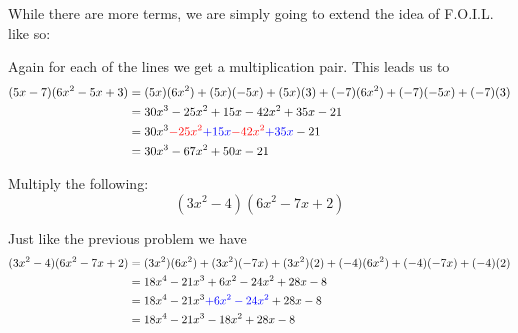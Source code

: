 \begin{solution}[2in]
While there are more terms, we are simply going to extend the idea of F.O.I.L. like so:
\begin{center}
\end{center}
Again for each of the lines we get a multiplication pair. This leads us to
\begin{align*}
(5x-7)(6x^2-5x+3)&=(5x)(6x^2)+(5x)(-5x)+(5x)(3)+(-7)(6x^2)+(-7)(-5x)+(-7)(3)\\
&=30x^3-25x^2+15x-42x^2+35x-21\\
&=30x^3{\color{red}-25x^2}{\color{blue}+15x}{\color{red}-42x^2}{\color{blue}+35x}-21\\
&=30x^3-67x^2+50x-21
\end{align*}
\end{solution}
\vspace{0.5em}

\begin{exercise}
Multiply the following:
\[
(3x^2-4)(6x^2-7x+2)
\]
\end{exercise}
\begin{solution}[2in]
Just like the previous problem we have
\begin{align*}
(3x^2-4)(6x^2-7x+2)&=(3x^2)(6x^2)+(3x^2)(-7x)+(3x^2)(2)+(-4)(6x^2)+(-4)(-7x)+(-4)(2)\\
&=18x^4-21x^3+6x^2-24x^2+28x-8\\
&=18x^4-21x^3{\color{blue}+6x^2-24x^2}+28x-8\\
&=18x^4-21x^3-18x^2+28x-8
\end{align*}
\end{solution}
\vspace{0.5em}

\ifprintanswers
\newpage
\fi

